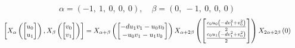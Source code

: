 \documentclass[11pt]{article}
\theoremstyle{definition}
\begin{document}
\[
\alpha = \left( -1, \  1, \  0, \  0, \  0\right), \quad \beta = \left( 0, \  -1, \  0, \  0, \  0\right)
\]
\[
\scaletoalign{\textwidth}{\left[ X_{\alpha}\left(\left[\begin{matrix}u_{0}\\u_{1}\end{matrix}\right]\right), X_{\beta}\left(\left[\begin{matrix}v_{0}\\v_{1}\end{matrix}\right]\right) \right] = X_{\alpha + \beta}\left(\left[\begin{matrix}- d u_{1} v_{1} - u_{0} v_{0}\\- u_{0} v_{1} - u_{1} v_{0}\end{matrix}\right]\right) X_{\alpha + 2\beta}\left(\left[\begin{matrix}\frac{c_{0} u_{0} \left(- d v_{1}^{2} + v_{0}^{2}\right)}{2}\\\frac{c_{0} u_{1} \left(- d v_{1}^{2} + v_{0}^{2}\right)}{2}\end{matrix}\right]\right) X_{2\alpha + 2\beta}\left(0\right)}
\]
\end{document}
